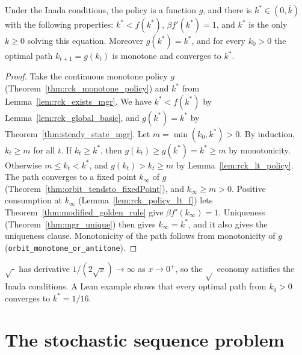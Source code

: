 \begin{theorem}
\label{thm:rck_global_convergence}
\leanok
{}
Under the Inada conditions, the policy is a function $g$, and there is $k^* \in (0, \bar k)$ with the following
properties: $k^* < f(k^*)$, $\beta f'(k^*) = 1$, and $k^*$ is the only $k \ge 0$ solving this equation.
Moreover $g(k^*) = k^*$, and for every $k_0 > 0$ the optimal path $k_{t+1} = g(k_t)$ is monotone and converges
to $k^*$.
\end{theorem}
\begin{proof}
\leanok
{}
Take the continuous monotone policy $g$ (Theorem~\ref{thm:rck_monotone_policy}) and $k^*$ from
Lemma~\ref{lem:rck_exists_mgr}. We have $k^* < f(k^*)$ by Lemma~\ref{lem:rck_global_basic}, and
$g(k^*) = k^*$ by Theorem~\ref{thm:steady_state_mgr}. Let $m = \min(k_0, k^*) > 0$. By induction, $k_t \ge m$ for
all $t$. If $k_t \ge k^*$, then $g(k_t) \ge g(k^*) = k^* \ge m$ by monotonicity. Otherwise $m \le k_t < k^*$, and
$g(k_t) > k_t \ge m$ by Lemma~\ref{lem:rck_lt_policy}. The path converges to a fixed point $k_\infty$ of $g$
(Theorem~\ref{thm:orbit_tendsto_fixedPoint}), and $k_\infty \ge m > 0$. Positive consumption at $k_\infty$
(Lemma~\ref{lem:rck_policy_lt_f}) lets Theorem~\ref{thm:modified_golden_rule} give $\beta f'(k_\infty) = 1$.
Uniqueness (Theorem~\ref{thm:mgr_unique}) then gives $k_\infty = k^*$, and it also gives the uniqueness clause.
Monotonicity of the path follows from monotonicity of $g$ (\texttt{orbit\_monotone\_or\_antitone}).
\end{proof}

\begin{remark}[Witness]
\label{rem:rck_inada_example}
\leanok
$\sqrt{\cdot}$ has derivative $1/(2\sqrt x) \to \infty$ as $x \to 0^+$, so the $\sqrt{}$ economy satisfies the
Inada conditions. A Lean example shows that every optimal path from $k_0 > 0$ converges to $k^* = 1/16$.
\end{remark}

\section{The stochastic sequence problem}
\label{sec:stoch_plan}

